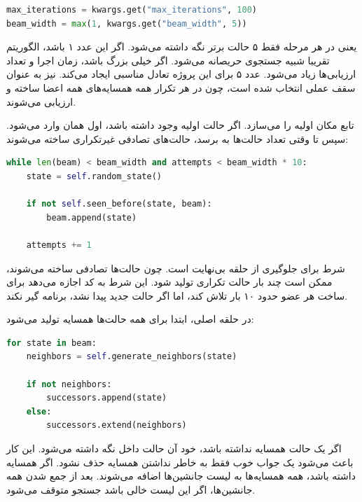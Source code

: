 \documentclass[10.5pt]{exam}
\begin{document}
\begin{latin}
\begin{lstlisting}[language=Python]
max_iterations = kwargs.get("max_iterations", 100)
beam_width = max(1, kwargs.get("beam_width", 5))
\end{lstlisting}
\end{latin}

یعنی در هر مرحله فقط ۵ حالت برتر نگه داشته می‌شود. اگر این عدد ۱ باشد، الگوریتم تقریبا شبیه جستجوی حریصانه می‌شود. اگر خیلی بزرگ باشد، زمان اجرا و تعداد ارزیابی‌ها زیاد می‌شود. عدد ۵ برای این پروژه تعادل مناسبی ایجاد می‌کند.
نیز به عنوان سقف عملی انتخاب شده است، چون در هر تکرار همه همسایه‌های همه اعضا ساخته و ارزیابی می‌شوند.

تابع
مکان اولیه را می‌سازد. اگر حالت اولیه وجود داشته باشد، اول همان وارد می‌شود. سپس تا وقتی تعداد حالت‌ها به
برسد، حالت‌های تصادفی غیرتکراری ساخته می‌شوند:

\begin{latin}
\begin{lstlisting}[language=Python]
while len(beam) < beam_width and attempts < beam_width * 10:
    state = self.random_state()

    if not self.seen_before(state, beam):
        beam.append(state)

    attempts += 1
\end{lstlisting}
\end{latin}

شرط
برای جلوگیری از حلقه بی‌نهایت است. چون حالت‌ها تصادفی ساخته می‌شوند، ممکن است چند بار حالت تکراری تولید شود. این شرط به کد اجازه می‌دهد برای ساخت هر عضو حدود ۱۰ بار تلاش کند، اما اگر حالت جدید پیدا نشد، برنامه گیر نکند.

در حلقه اصلی، ابتدا برای همه حالت‌ها همسایه تولید می‌شود:

\begin{latin}
\begin{lstlisting}[language=Python]
for state in beam:
    neighbors = self.generate_neighbors(state)

    if not neighbors:
        successors.append(state)
    else:
        successors.extend(neighbors)
\end{lstlisting}
\end{latin}

اگر یک حالت همسایه نداشته باشد، خود آن حالت داخل
نگه داشته می‌شود. این کار باعث می‌شود یک جواب خوب فقط به خاطر نداشتن همسایه حذف نشود. اگر همسایه داشته باشد، همه همسایه‌ها به لیست جانشین‌ها اضافه می‌شوند. بعد از جمع شدن همه جانشین‌ها، اگر این لیست خالی باشد جستجو متوقف می‌شود.
\end{document}
